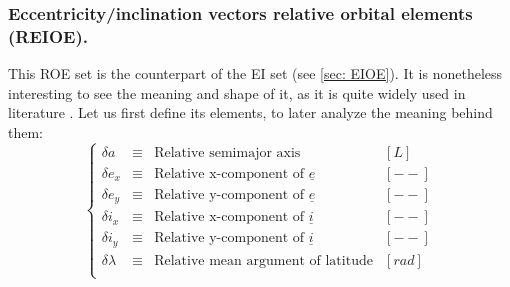 	\subsubsection{Eccentricity/inclination vectors relative orbital elements (REIOE).}
	\indent This ROE set is the counterpart of the EI set (see \ref{sec: EIOE}). It is nonetheless interesting to see the meaning and shape of it, as it is quite widely used in literature \cite{DAmico_montenbruck, Schaub2004, dAmicoDLR}. Let us first define its elements, to later analyze the meaning behind them:
	\begin{equation}
	\left\{ 
	\begin{array}{llll}
	\delta a 	& \equiv & \text{Relative semimajor axis} & [L]\\
	\delta e_x 	& \equiv & \text{Relative x-component of }\underline{e} & [--]\\
	\delta e_y 	& \equiv & \text{Relative y-component of }\underline{e} & [--]\\
	\delta i_x 	& \equiv & \text{Relative x-component of }\underline{i} & [--]\\
	\delta i_y 	& \equiv & \text{Relative y-component of }\underline{i} & [--]\\
	\delta \lambda & \equiv 	& \text{Relative mean argument of latitude} & [rad]\\
	\end{array}
	\right.
	\label{eq: 	def_REIOE}
	\end{equation}
